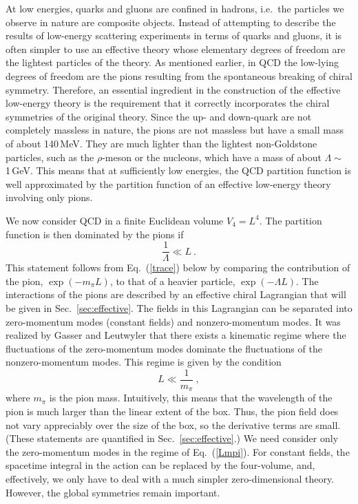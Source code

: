 At low energies, quarks and gluons are confined in hadrons, i.e.\ the
particles we observe in nature are composite objects.  Instead of
attempting to describe the results of low-energy scattering
experiments in terms of quarks and gluons, it is often simpler to use
an effective theory whose elementary degrees of freedom are the
lightest particles of the theory. As mentioned earlier, in QCD the
low-lying degrees of freedom are the pions resulting from the
spontaneous breaking of chiral symmetry.  Therefore, an essential
ingredient in the construction of the effective low-energy theory is
the requirement that it correctly incorporates the chiral symmetries
of the original theory.  Since the up- and down-quark are not
completely massless in nature, the pions are not massless but have a
small mass of about 140\,MeV.  They are much lighter than
the lightest non-Goldstone particles, such as the $\rho$-meson or the
nucleons, which have a mass of about $\Lambda\sim$ 1\,GeV. This means
that at sufficiently low energies, the QCD partition function is well
approximated by the partition function of an effective low-energy
theory involving only pions.

We now consider QCD in a finite Euclidean volume $V_4=L^4$.  The
partition function is then dominated by the pions if
\begin{equation}
  \frac{1}{\Lambda}\ll L\:.
\end{equation}
This statement follows from Eq.~(\ref{trace}) below by comparing the
contribution of the pion, $\exp(-m_\pi L)$, to that of a heavier
particle, $\exp(-\Lambda L)$.  The interactions of the pions are
described by an effective chiral Lagrangian that will be given in
Sec.~\ref{sec:effective}. The fields in this Lagrangian can be
separated into zero-momentum modes (constant fields) and
nonzero-momentum modes. It was realized by Gasser and Leutwyler
\cite{GL} that there exists a kinematic regime where the fluctuations
of the zero-momentum modes dominate the fluctuations of the
nonzero-momentum modes.  This regime is given by the condition
\begin{equation}
  \label{Lmpi}
  L\ll\frac{1}{m_\pi}\:,
\end{equation}
where $m_\pi$ is the pion mass.  Intuitively, this means that the
wavelength of the pion is much larger than the linear extent of the
box.  Thus, the pion field does not vary appreciably over the size of
the box, so the derivative terms are small.  
(These statements are quantified in Sec.~\ref{sec:effective}.) We need
consider only the zero-momentum modes in the regime of
Eq.~(\ref{Lmpi}).  For constant fields, the spacetime integral in the
action can be replaced by the four-volume, and, effectively, we only
have to deal with a much simpler zero-dimensional theory.
However, the global symmetries remain important.

